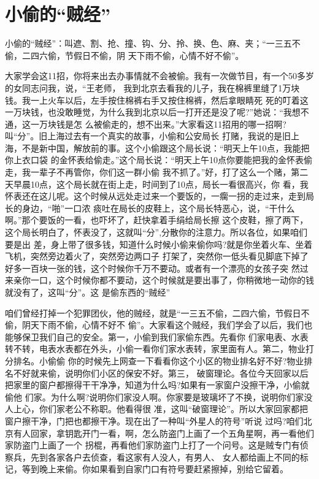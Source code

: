 \documentclass[11pt,a4paper,onecolumn]{article}
\begin{document}
\section{小偷的``贼经''}

小偷的``贼经''：叫遮、割、抢、撞、钩、分、拎、换、色、麻、夹；``一三五不偷，二四六偷，节假日不偷，阴
天下雨不偷，心情不好不偷''。

大家学会这11招，你将来出去办事情就不会被偷。我有一次做节目，有一个50多岁的女同志问我，说，``王老师，
我到北京去看我的儿子，我在棉裤里缝了1万块钱。我一上火车以后，左手按住棉裤右手又按住棉裤，然后拿眼睛死
死的叮着这一万块钱，也没敢睡觉，为什么我到北京以后一打开还是没了呢?''她说：``我想不通，这一万块钱是怎
么被偷走的，想不出来。''大家看这11招用的哪一招啊?叫``分''。旧上海过去有一个真实的故事，小偷和公安局长
打赌，我说的是旧上海，不是新中国，解放前的事。这个小偷跟这个局长说：``明天上午10点，我能把你上衣口袋
的金怀表给偷走。''这个局长说：``明天上午10点你要能把我的金怀表偷走，我一辈子不再管你，你们这一群小偷
我不抓了。''好，打了这么一个赌，第二天早晨10点，这个局长就在街上走，时间到了10点，局长一看很高兴，你
看，我怀表还在这儿呢。这个时候从远处走过来一个要饭的，一瘸一拐的走过来，走到局长的身边，``啪''一口浓
痰吐在局长的皮鞋上，这个局长特恶心，说，``干什么啊。''那个要饭的一看，也吓坏了，赶快拿着手绢给局长擦
这个皮鞋，擦了两下，这个局长明白了，怀表没了，这就叫``分'',分散你的注意力。所以各位，如果咱们要是出
差，身上带了很多钱，知道什么时候小偷来偷你吗?就是你坐着火车、坐着飞机，突然旁边着火了，突然旁边两口子
打架了，突然你一低头看见脚底下掉了好多一百块一张的钱，这个时候你千万不要动。或者有一个漂亮的女孩子突
然过来亲你一口，这个时候你都不要动，这个时候就是要出事了，你稍微地一动你的钱就没有了，这叫``分''。这
是偷东西的``贼经''

咱们曾经打掉一个犯罪团伙，他的贼经，就是``一三五不偷，二四六偷，节假日不偷，阴天下雨不偷，心情不好不
偷''。大家看这个贼经，我们学会了以后，我们也能够保卫我们自己的安全。第一，小偷到我们家偷东西。先看你
们家电表、水表转不转，电表水表都在外头，小偷一看你们家水表转，家里面有人。第二，物业打分排名。小偷偷
你的时候先上网查一下看看你这个小区的物业排名好不好?物业排名不好就来偷，说明你们小区的保安不好。第三，
破窗理论。各位今天回家以后把家里的窗户都擦得干干净净，知道为什么吗?如果有一家窗户没擦干净，小偷就偷他
们家。为什么啊?说明你们家没人啊。你家要是玻璃坏了不换，说明你们家没人上心，你们家老公不称职。他看得很
准，这叫``破窗理论''。所以大家回家都把窗户擦干净，门把也都擦干净。现在出了一种叫``外星人的符号''听说
过吗?咱们北京有人回家，拿钥匙开门一看，啊，怎么防盗门上画了一个五角星啊，再一看他们家防盗门上画了一个
拐棍，再看他们家防盗门上打了一个问号。这是贼专门有侦察兵，先到各家各户去侦查，看这家有人没人，有男人、
女人都给画上不同的标记，等到晚上来偷。你如果看到自家门口有符号要赶紧擦掉，别给它留着。
\end{document}
